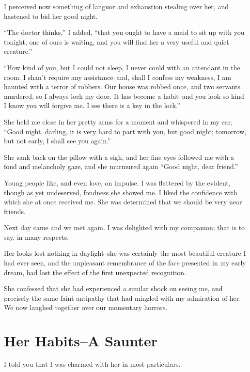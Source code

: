 \documentclass[11pt,twoside,makeidx,hidelinks,]{memoir}
\begin{document}
I perceived now something of languor and exhaustion stealing over her,
and hastened to bid her good night.

``The doctor thinks,'' I added, ``that you ought to have a maid to sit up
with you tonight; one of ours is waiting, and you will find her a very
useful and quiet creature.''

``How kind of you, but I could not sleep, I never could with an attendant
in the room. I shan't require any assistance--and, shall I confess my
weakness, I am haunted with a terror of robbers. Our house was robbed
once, and two servants murdered, so I always lock my door. It has become
a habit--and you look so kind I know you will forgive me. I see there is
a key in the lock.''

She held me close in her pretty arms for a moment and whispered in my
ear, ``Good night, darling, it is very hard to part with you, but good
night; tomorrow, but not early, I shall see you again.''

She sank back on the pillow with a sigh, and her fine eyes followed me
with a fond and melancholy gaze, and she murmured again ``Good night,
dear friend.''

Young people like, and even love, on impulse. I was flattered by the
evident, though as yet undeserved, fondness she showed me. I liked the
confidence with which she at once received me. She was determined that
we should be very near friends.

Next day came and we met again. I was delighted with my companion; that
is to say, in many respects.

Her looks lost nothing in daylight--she was certainly the most beautiful
creature I had ever seen, and the unpleasant remembrance of the face
presented in my early dream, had lost the effect of the first unexpected
recognition.

She confessed that she had experienced a similar shock on seeing me, and
precisely the same faint antipathy that had mingled with my admiration
of her. We now laughed together over our momentary horrors.

\pbreak{}

\chapter{Her Habits--A Saunter}\hypertarget{her-habits--a-saunter}{}\label{her-habits--a-saunter}

I told you that I was charmed with her in most particulars.
\end{document}
